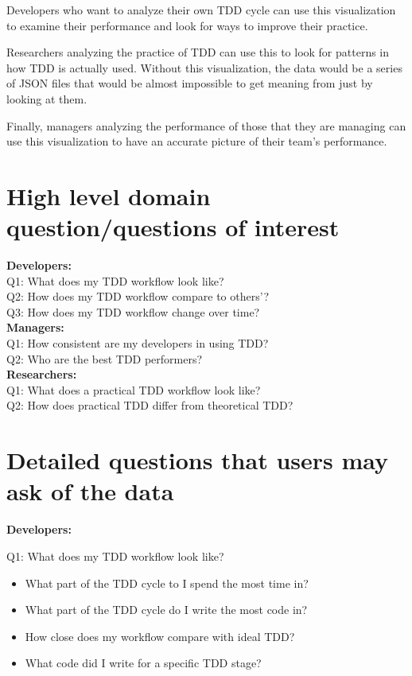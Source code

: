 \documentclass[journal]{vgtc}                %
\begin{document}
Developers who want to analyze their own TDD cycle can use this visualization to examine their performance and look for ways to improve their practice.

Researchers analyzing the practice of TDD can use this to look for patterns in how TDD is actually used.  Without this visualization, the data would be a series of JSON files that would be almost impossible to get meaning from just by looking at them.  

Finally, managers analyzing the performance of those that they are managing can use this visualization to have an accurate picture of their team's performance.

\section{High level domain question/questions of interest}
\label{sec:highq}

\textbf{Developers:} \\
Q1: What does my TDD workflow look like? \\
Q2: How does my TDD workflow compare to others'? \\
Q3: How does my TDD workflow change over time? \\

\textbf{Managers:} \\
Q1: How consistent are my developers in using TDD? \\
Q2: Who are the best TDD performers? \\

\textbf{Researchers:} \\
Q1: What does a practical TDD workflow look like? \\
Q2: How does practical TDD differ from theoretical TDD? \\

\section{Detailed questions that users may ask of the data}

\textbf{Developers:}

Q1: What does my TDD workflow look like? 
\begin{itemize}
	\item What part of the TDD cycle to I spend the most time in?
	\item What part of the TDD cycle do I write the most code in?
	\item How close does my workflow compare with ideal TDD?
	\item What code did I write for a specific TDD stage?
\end{itemize}
\end{document}
